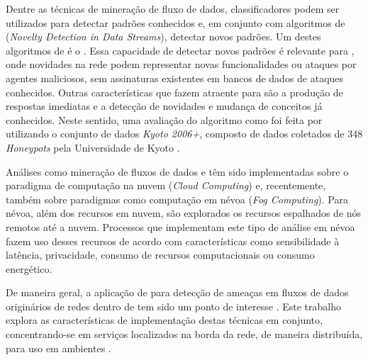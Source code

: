 
Dentre as técnicas de mineração de fluxo de dados, classificadores podem ser
utilizados para detectar padrões conhecidos e, em conjunto com algoritmos de
\nd (\emph{Novelty Detection in Data Streams}), detectar novos padrões.
Um destes algoritmos de \nd é o \minas \cite{Faria2013Minas}.
Essa capacidade de detectar novos padrões é relevante para \nids, onde novidades
na rede podem representar novas funcionalidades ou ataques por agentes
maliciosos, sem assinaturas existentes em bancos de dados de ataques conhecidos.
Outras características que fazem \nd atraente para \nids são a produção de
respostas imediatas e a detecção de novidades e mudança de conceitos já
conhecidos.
Neste sentido, uma avaliação do algoritmo \minas como \nids foi feita por
 utilizando o conjunto de dados \emph{Kyoto 2006+},
composto de dados coletados de 348 \emph{Honeypots} pela Universidade de Kyoto
\cite{KyotoDataset}.

Análises como mineração de fluxos de dados e \nd têm sido implementadas sobre
o paradigma de computação na nuvem (\emph{Cloud Computing}) e, recentemente,
também sobre paradigmas como computação em névoa (\emph{Fog Computing}).
Para névoa, além dos recursos em nuvem, são explorados os recursos
espalhados de nós remotos até a nuvem.
Processos que implementam este tipo de análise em névoa fazem uso desses
recursos de acordo com características como sensibilidade à latência,
privacidade, consumo de recursos computacionais ou consumo energético.

De maneira geral, a aplicação de \nd para detecção de ameaças em fluxos de dados
originários de redes \iot dentro de \nids tem sido um ponto de interesse
\cite{Viegas2019,AndreoniLopez2019,DaCosta2019a}.
Este trabalho explora as características de implementação destas técnicas
em conjunto, concentrando-se em serviços localizados na borda da rede, de maneira
distribuída, para uso em ambientes \iot.


